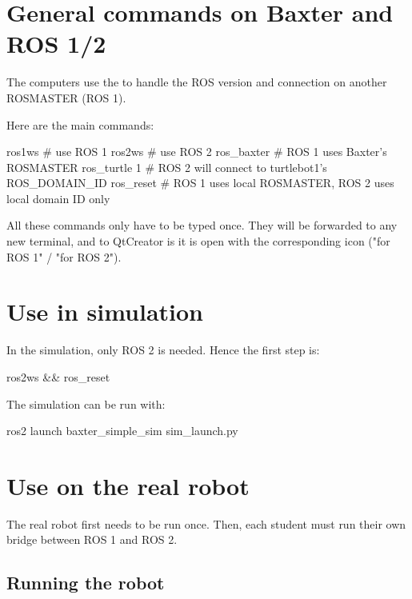 \documentclass{ecnreport}
\author{O. Kermorgant}
\begin{document}


\section{General commands on Baxter and ROS 1/2}

The computers use the  to handle the ROS version and connection on another ROSMASTER (ROS 1).

Here are the main commands:
\begin{bashcodelarge}
ros1ws  # use ROS 1
ros2ws # use ROS 2
ros_baxter # ROS 1 uses Baxter's ROSMASTER
ros_turtle 1  # ROS 2 will connect to turtlebot1's ROS_DOMAIN_ID
ros_reset # ROS 1 uses local ROSMASTER, ROS 2 uses local domain ID only
\end{bashcodelarge}

All these commands only have to be typed once. They will be forwarded to any new terminal, and to QtCreator is it is open with the corresponding icon ("for ROS 1" / "for ROS 2").

\section{Use in simulation}

In the simulation, only ROS 2 is needed. Hence the first step is:
\begin{bashcodelarge}
ros2ws && ros_reset
\end{bashcodelarge}

The simulation can be run with:
\begin{bashcodelarge}
 ros2 launch baxter_simple_sim sim_launch.py
\end{bashcodelarge}

\section{Use on the real robot}

The real robot first needs to be run once. Then, each student must run their own bridge between ROS 1 and ROS 2.

\subsection{Running the robot}
\end{document}
